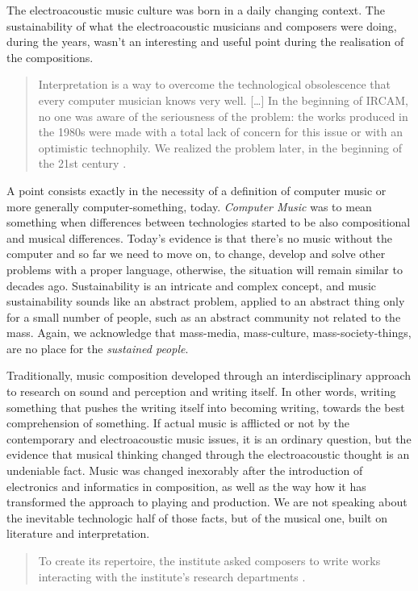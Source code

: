 \documentclass[twoside,a4paper]{article}
\begin{document}
The electroacoustic music culture was born in a daily changing context. The sustainability of what the electroacoustic musicians and composers were doing, during the years, wasn't an interesting and useful point during the realisation of the compositions. 

\begin{quote}
Interpretation is a way to overcome the technological obsolescence that every computer musician knows very well. [\ldots] In the beginning of IRCAM, no one was aware of the seriousness of the problem: the works produced in the 1980s were made with a total lack of concern for this issue or with an optimistic technophily. We realized the problem later, in the beginning of the 21st century \cite{lem16}.
\end{quote}

A point consists exactly in the necessity of a definition of computer music or more generally computer-something, today. \emph{Computer Music} was to mean something when differences between technologies started to be also compositional and musical differences. Today's evidence is that there's no music without the computer and so far we need to move on, to change, develop and solve other problems with a proper language, otherwise, the situation will remain similar to decades ago. Sustainability is an intricate and complex concept, and music sustainability sounds like an abstract problem, applied to an abstract thing only for a small number of people, such as an abstract community not related to the mass. Again, we acknowledge that mass-media, mass-culture, mass-society-things, are no place for the \emph{sustained people}.

Traditionally, music composition developed through an interdisciplinary approach to research on sound and perception and writing itself. In other words, writing something that pushes the writing itself into becoming writing, towards the best comprehension of something. If actual music is afflicted or not by the contemporary and electroacoustic music issues, it is an ordinary question, but the evidence that musical thinking changed through the electroacoustic thought is an undeniable fact. Music was changed inexorably after the introduction of electronics and informatics in composition, as well as the way how it has transformed the approach to playing and production. We are not speaking about the inevitable technologic half of those facts, but of the musical one, built on literature and interpretation.

\begin{quote}
To create its repertoire, the institute asked composers to write works interacting with the institute’s research departments \cite{lem16}.
\end{quote}
\end{document}
